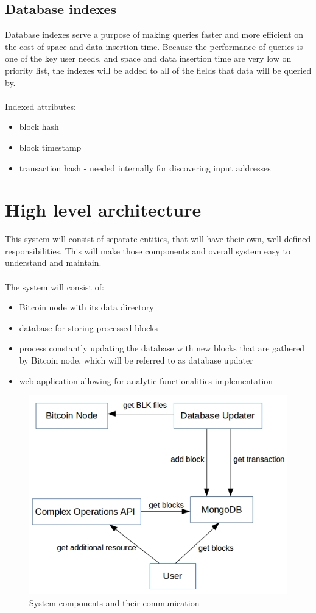 \documentclass[12pt, en, eng, oneside, final]{mgr}
\begin{document}
 

\subsection{Database indexes}

Database indexes serve a purpose of making queries faster and more efficient on the cost of space and data insertion time.
Because the performance of queries is one of the key user needs, and space and data insertion time are very low on priority list, the indexes will be added to all of the fields that data will be queried by.
\\
\\
Indexed attributes:
\begin{itemize}
\item
block hash
\item
block timestamp
\item
transaction hash - needed internally for discovering input addresses
\end{itemize} 


\section{High level architecture}
This system will consist of separate entities, that will have their own, well-defined responsibilities. This will make those components and overall system easy to understand and maintain.
\\
\\
The system will consist of:
\begin{itemize}
\item
Bitcoin node with its data directory
\item
database for storing processed blocks
\item
process constantly updating the database with new blocks that are gathered by Bitcoin node, which will be referred to as database updater
\item
web application allowing for analytic functionalities implementation
\end{itemize}

\begin{figure}[H]
  \includegraphics[width=0.8\linewidth]{component-diagram.png}
  \caption{System components and their communication}
  \label{fig:system-components-and-their-communication}
\end{figure}
\end{document}
